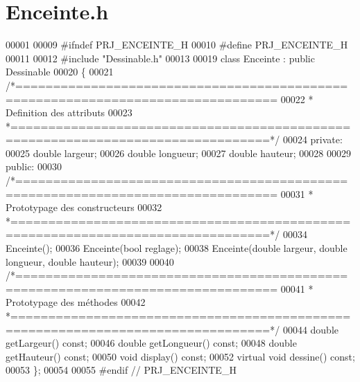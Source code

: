 \section{Enceinte.\+h}
\label{_enceinte_8h_source}

\begin{DoxyCode}
00001 
00009 \textcolor{preprocessor}{#ifndef PRJ\_ENCEINTE\_H}
00010 \textcolor{preprocessor}{#define PRJ\_ENCEINTE\_H}
00011 
00012 \textcolor{preprocessor}{#include "Dessinable.h"}
00013 
00019 \textcolor{keyword}{class }Enceinte : \textcolor{keyword}{public} Dessinable
00020 \{
00021 \textcolor{comment}{/*================================================================================}
00022 \textcolor{comment}{ * Definition des attributs}
00023 \textcolor{comment}{ *================================================================================*/}
00024     \textcolor{keyword}{private}:
00025     \textcolor{keywordtype}{double} largeur;
00026     \textcolor{keywordtype}{double} longueur;
00027     \textcolor{keywordtype}{double} hauteur; 
00028     
00029     \textcolor{keyword}{public}:
00030 \textcolor{comment}{/*================================================================================}
00031 \textcolor{comment}{ * Prototypage des constructeurs}
00032 \textcolor{comment}{ *================================================================================*/}
00034     Enceinte();
00036     Enceinte(\textcolor{keywordtype}{bool} reglage);
00038     Enceinte(\textcolor{keywordtype}{double} largeur, \textcolor{keywordtype}{double} longueur, \textcolor{keywordtype}{double} hauteur);
00039     
00040 \textcolor{comment}{/*================================================================================}
00041 \textcolor{comment}{ * Prototypage des méthodes}
00042 \textcolor{comment}{ *================================================================================*/}
00044     \textcolor{keywordtype}{double} getLargeur() \textcolor{keyword}{const};
00046     \textcolor{keywordtype}{double} getLongueur() \textcolor{keyword}{const};
00048     \textcolor{keywordtype}{double} getHauteur() \textcolor{keyword}{const};
00050     \textcolor{keywordtype}{void} display() \textcolor{keyword}{const};
00052     \textcolor{keyword}{virtual} \textcolor{keywordtype}{void} dessine() \textcolor{keyword}{const};
00053 \};
00054 
00055 \textcolor{preprocessor}{#endif // PRJ\_ENCEINTE\_H}
\end{DoxyCode}
